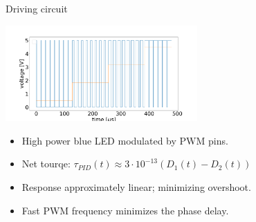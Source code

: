 \documentclass{beamer}
\begin{document}
\begin{frame}{Driving circuit}
	\begin{center}		
		\includegraphics[width=0.55\textwidth,keepaspectratio]{duty_cycle.png}
	\end{center}
	\begin{itemize}		
		\item High power blue LED modulated by PWM pins.
		\item Net tourqe: $\tau_{PID}(t)  \approx   3\cdot 10^{-13}(D_1(t) -D_2(t)) $
		\item Response approximately linear; minimizing overshoot.
		\item Fast PWM frequency minimizes the phase delay.
		
	\end{itemize}
\end{frame}
\end{document}
